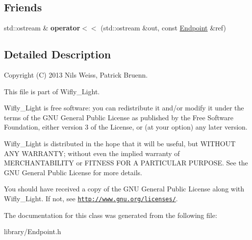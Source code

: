 \subsection*{Friends}
\begin{DoxyCompactItemize}
\item 
\hypertarget{class_endpoint_af3f74b3b812453bb6cc60400dfc0c82c}{std\-::ostream \& {\bfseries operator$<$$<$} (std\-::ostream \&out, const \hyperlink{class_endpoint}{Endpoint} \&ref)}\label{class_endpoint_af3f74b3b812453bb6cc60400dfc0c82c}

\end{DoxyCompactItemize}


\subsection{Detailed Description}
\begin{DoxyVerb}Copyright (C) 2013 Nils Weiss, Patrick Bruenn.
\end{DoxyVerb}


This file is part of Wifly\-\_\-\-Light.

Wifly\-\_\-\-Light is free software\-: you can redistribute it and/or modify it under the terms of the G\-N\-U General Public License as published by the Free Software Foundation, either version 3 of the License, or (at your option) any later version.

Wifly\-\_\-\-Light is distributed in the hope that it will be useful, but W\-I\-T\-H\-O\-U\-T A\-N\-Y W\-A\-R\-R\-A\-N\-T\-Y; without even the implied warranty of M\-E\-R\-C\-H\-A\-N\-T\-A\-B\-I\-L\-I\-T\-Y or F\-I\-T\-N\-E\-S\-S F\-O\-R A P\-A\-R\-T\-I\-C\-U\-L\-A\-R P\-U\-R\-P\-O\-S\-E. See the G\-N\-U General Public License for more details.

You should have received a copy of the G\-N\-U General Public License along with Wifly\-\_\-\-Light. If not, see \href{http://www.gnu.org/licenses/}{\tt http\-://www.\-gnu.\-org/licenses/}. 

The documentation for this class was generated from the following file\-:\begin{DoxyCompactItemize}
\item 
library/Endpoint.\-h\end{DoxyCompactItemize}
